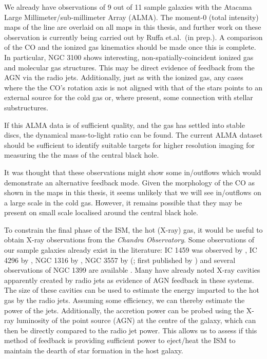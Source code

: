 	We already have observations of 9 out of 11 sample galaxies with the Atacama Large Millimeter/sub-millimeter Array (ALMA). The moment-0 (total intensity) maps of the  line are overlaid on all maps in this thesis, and further work on these observation is currently being carried out by Ruffa et.al.\ (in prep.). A comparison of the CO and the ionized gas kinematics should be made once this is complete. In particular, NGC 3100 shows interesting, non-spatially-coincident ionized gas and molecular gas structures. This may be direct evidence of feedback from the AGN via the radio jets. Additionally, just as with the ionized gas, any cases where the the CO's rotation axis is not aligned with that of the stars points to an external source for the cold gas or, where present, some connection with stellar substructures.

	If this ALMA data is of sufficient quality, and the gas has settled into stable discs, the dynamical mass-to-light ratio can be found. The current ALMA dataset should be sufficient to identify suitable targets for higher resolution imaging for measuring the the mass of the central black hole. 

	It was thought that these observations might show some in/outflows which would demonstrate an alternative feedback mode. Given the morphology of the CO as shown in the maps in this thesis, it seems unlikely that we will see in/outflows on a large scale in the cold gas. However, it remains possible that they may be present on small scale localised around the central black hole. 

	To constrain the final phase of the ISM, the hot (X-ray) gas, it would be useful to obtain X-ray observations from the \textit{Chandra Observatory}. Some observations of our sample galaxies already exist in the literature: IC 1459 was observed by \citet{Fabbiano2003}, IC 4296 by \citet{Pellegrini2002}, NGC 1316 by \citet{Lanz2010}, NGC 3557 by \citeauthor{Ponman2001} (\citeyear{Ponman2001}; first published by \citealt{Balmaverde2005}) and several observations of NGC 1399 are available \citep[e.g.][]{Su2017}. Many have already noted X-ray cavities apparently created by radio jets as evidence of AGN feedback in these systems. The size of these cavities can be used to estimate the energy imparted to the hot gas by the radio jets. Assuming some efficiency, we can thereby estimate the power of the jets. Additionally, the accretion power can be probed using the X-ray luminosity of the point source (AGN) at the centre of the galaxy, which can then be directly compared to the radio jet power. This allows us to assess if this method of feedback is providing sufficient power to eject/heat the ISM to maintain the dearth of star formation in the host galaxy.

